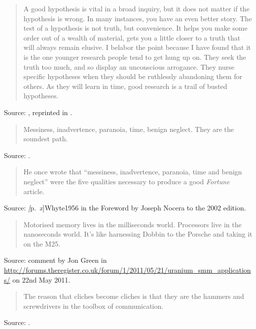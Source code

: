 \documentclass[a4paper]{article}
\begin{document}
\begin{quote}
	A good hypothesis is vital in a broad inquiry, but it does not
	matter if the hypothesis is wrong.  In many instances, you have
	an even better story.  The test of a hypothesis is not truth,
	but convenience.  It helps you make some order out of a wealth
	of material, gets you a little closer to a truth that will always
	remain elusive.  I belabor the point because I have found that
	it is the one younger research people tend to get hung up on.
	They seek the truth too much, and so display an unconscious
	arrogance.  They nurse specific hypotheses when they should be
	ruthlessly abandoning them for others.  As they will learn in
	time, good research is a trail of busted hypotheses.
\end{quote}
Source: \citet{Whyte1980}, reprinted in \citet{LaFarge2000}.
\medskip

\begin{quote}
	Messiness, inadvertence, paranoia, time, benign neglect.  They
	are the soundest path.
\end{quote}
Source: \citet[p.~120]{Whyte1980}.
\medskip

\begin{quote}
	He once wrote that ``messiness, inadvertence, paranoia, time
	and benign neglect'' were the five qualities necessary to
	produce a good \emph{Fortune} article.
\end{quote}
Source: \emph[p.~{\it x}]{Whyte1956} in the Foreword by Joseph Nocera
to the 2002 edition.
\medskip

\begin{quote}
	Motorised memory lives in the milliseconds world. Processors
	live in the nanoseconds world. It's like harnessing Dobbin to
	the Porsche and taking it on the M25.
\end{quote}
Source: comment by Jon Green in
\url{http://forums.theregister.co.uk/forum/1/2011/05/21/uranium_smm_applications/}
on 22nd May 2011.
\medskip

\begin{quote}
	The reason that cliches become cliches is that they are the
	hammers and screwdrivers in the toolbox of communication.
\end{quote}
Source: \citet[p.~146]{Pratchett1989}.
\medskip
\end{document}
